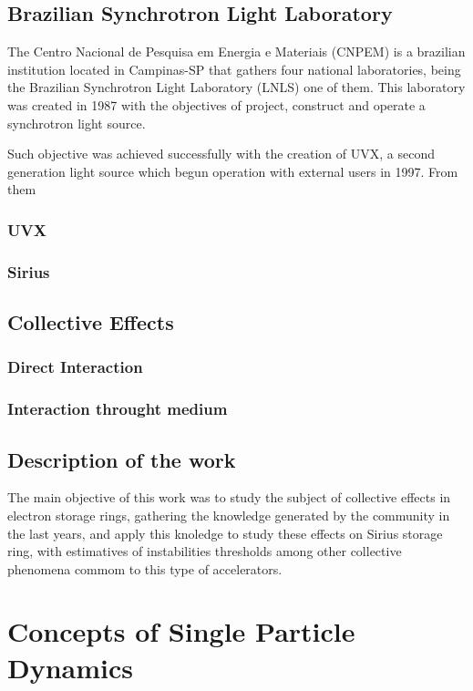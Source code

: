 \documentclass[
	12pt,				%
	openright,			%
	oneside,			%
	a4paper,		%
	chapter=TITLE,		%
	section=TITLE,		%
    brazil,				%
	english,			%
	sumario=tradicional,
	]{abntex2}
\begin{document}
  \section{Brazilian Synchrotron Light Laboratory}

  The Centro Nacional de Pesquisa em Energia e Materiais (CNPEM) is a brazilian institution located in Campinas-SP that gathers four national laboratories, being the Brazilian Synchrotron Light Laboratory (LNLS) one of them. This laboratory was created in 1987 with the objectives of project, construct and operate a synchrotron light source.

  Such objective was achieved successfully with the creation of UVX, a second generation light source which begun operation with external users in 1997. From them

    \subsection{UVX}
    \subsection{Sirius}
  \section{Collective Effects}
    \subsection{Direct Interaction}
    \subsection{Interaction throught medium}
  \section{Description of the work}

  The main objective of this work was to study the subject of collective effects in electron storage rings, gathering the knowledge generated by the community in the last years, and apply this knoledge to study these effects on Sirius storage ring, with estimatives of instabilities thresholds among other collective phenomena commom to this type of accelerators.


\chapter{Concepts of Single Particle Dynamics}
\end{document}
